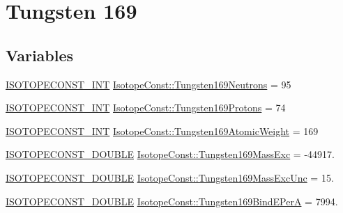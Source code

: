 \hypertarget{group___isotope_const-_tungsten-_w169}{}\section{Tungsten 169}
\label{group___isotope_const-_tungsten-_w169}
\subsection*{Variables}
\begin{DoxyCompactItemize}
\item 
\mbox{\hyperlink{group___isotope_const-_macros_ga5f18360b3e99483a35c32d789e62621c}{I\+S\+O\+T\+O\+P\+E\+C\+O\+N\+S\+T\+\_\+\+I\+NT}} \mbox{\hyperlink{group___isotope_const-_tungsten-_w169_ga74efdb565618e2294a3ebf93ef341166}{Isotope\+Const\+::\+Tungsten169\+Neutrons}} = 95
\item 
\mbox{\hyperlink{group___isotope_const-_macros_ga5f18360b3e99483a35c32d789e62621c}{I\+S\+O\+T\+O\+P\+E\+C\+O\+N\+S\+T\+\_\+\+I\+NT}} \mbox{\hyperlink{group___isotope_const-_tungsten-_w169_ga63506f1555696400feaca1c1d46a407b}{Isotope\+Const\+::\+Tungsten169\+Protons}} = 74
\item 
\mbox{\hyperlink{group___isotope_const-_macros_ga5f18360b3e99483a35c32d789e62621c}{I\+S\+O\+T\+O\+P\+E\+C\+O\+N\+S\+T\+\_\+\+I\+NT}} \mbox{\hyperlink{group___isotope_const-_tungsten-_w169_gaba0fbbb87769dbf27ab37ff8512734f5}{Isotope\+Const\+::\+Tungsten169\+Atomic\+Weight}} = 169
\item 
\mbox{\hyperlink{group___isotope_const-_macros_ga8f45a7272ce02c0b4c65c44636ed719a}{I\+S\+O\+T\+O\+P\+E\+C\+O\+N\+S\+T\+\_\+\+D\+O\+U\+B\+LE}} \mbox{\hyperlink{group___isotope_const-_tungsten-_w169_gadef635c361877351e9ffbea6e430217c}{Isotope\+Const\+::\+Tungsten169\+Mass\+Exc}} = -\/44917.
\item 
\mbox{\hyperlink{group___isotope_const-_macros_ga8f45a7272ce02c0b4c65c44636ed719a}{I\+S\+O\+T\+O\+P\+E\+C\+O\+N\+S\+T\+\_\+\+D\+O\+U\+B\+LE}} \mbox{\hyperlink{group___isotope_const-_tungsten-_w169_ga784a1b5fec1d0c73826427609ad3c5d5}{Isotope\+Const\+::\+Tungsten169\+Mass\+Exc\+Unc}} = 15.
\item 
\mbox{\hyperlink{group___isotope_const-_macros_ga8f45a7272ce02c0b4c65c44636ed719a}{I\+S\+O\+T\+O\+P\+E\+C\+O\+N\+S\+T\+\_\+\+D\+O\+U\+B\+LE}} \mbox{\hyperlink{group___isotope_const-_tungsten-_w169_gae2cdfe6cc2355621e4bda3169a960c8b}{Isotope\+Const\+::\+Tungsten169\+Bind\+E\+PerA}} = 7994.
\item 

\end{DoxyCompactItemize}
